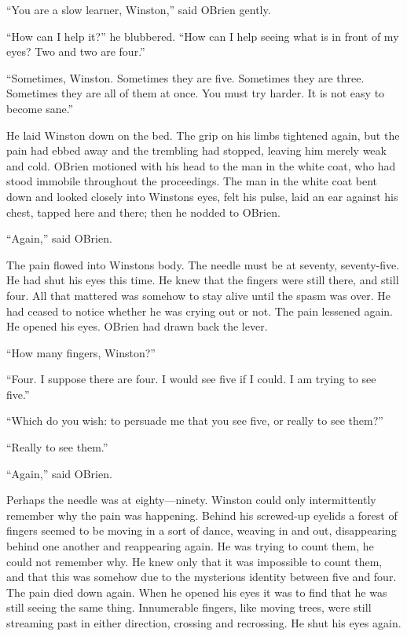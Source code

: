 ``You are a slow learner, Winston,'' said O\textquotesingle Brien gently.

``How can I help it?'' he blubbered. ``How can I help seeing what is in
front of my eyes? Two and two are four.''

``Sometimes, Winston. Sometimes they are five. Sometimes they are three.
Sometimes they are all of them at once. You must try harder. It is not
easy to become sane.''

He laid Winston down on the bed. The grip on his limbs tightened again,
but the pain had ebbed away and the trembling had stopped, leaving him
merely weak and cold. O\textquotesingle Brien motioned with his head to
the man in the white coat, who had stood immobile throughout the
proceedings. The man in the white coat bent down and looked closely into
Winston\textquotesingle s eyes, felt his pulse, laid an ear against his
chest, tapped here and there; then he nodded to O\textquotesingle Brien.

``Again,'' said O\textquotesingle Brien.

The pain flowed into Winston\textquotesingle s body. The needle must be
at seventy, seventy-five. He had shut his eyes this time. He knew that
the fingers were still there, and still four. All that mattered was
somehow to stay alive until the spasm was over. He had ceased to notice
whether he was crying out or not. The pain lessened again. He opened his
eyes. O\textquotesingle Brien had drawn back the lever.

``How many fingers, Winston?''

``Four. I suppose there are four. I would see five if I could. I am
trying to see five.''

``Which do you wish: to persuade me that you see five, or really to see
them?''

``Really to see them.''

``Again,'' said O\textquotesingle Brien.

Perhaps the needle was at eighty---ninety. Winston could only
intermittently remember why the pain was happening. Behind his
screwed-up eyelids a forest of fingers seemed to be moving in a sort of
dance, weaving in and out, disappearing behind one another and
reappearing again. He was trying to count them, he could not remember
why. He knew only that it was impossible to count them, and that this
was somehow due to the mysterious identity between five and four. The
pain died down again. When he opened his eyes it was to find that he was
still seeing the same thing. Innumerable fingers, like moving trees,
were still streaming past in either direction, crossing and recrossing.
He shut his eyes again.

